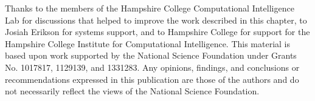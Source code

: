 \begin{acknowledgement}
	Thanks to the members of the Hampshire College Computational Intelligence Lab for discussions that helped to improve the work described in this chapter, to Josiah Erikson for systems support, and to Hampshire College for support for the Hampshire College Institute for Computational Intelligence. This material is based upon work supported by the National Science Foundation under Grants No. 1017817, 1129139, and 1331283. Any opinions, findings, and conclusions or recommendations expressed in this publication are those of the authors and do not necessarily reflect the views of the National Science Foundation.
\end{acknowledgement}



